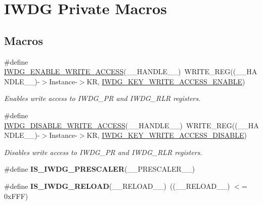 \hypertarget{group___i_w_d_g___private___macros}{}\section{I\+W\+DG Private Macros}
\label{group___i_w_d_g___private___macros}
\subsection*{Macros}
\begin{DoxyCompactItemize}
\item 
\#define \hyperlink{group___i_w_d_g___private___macros_ga65cf77f3cfd45d3fd66c0cf33d23d7ab}{I\+W\+D\+G\+\_\+\+E\+N\+A\+B\+L\+E\+\_\+\+W\+R\+I\+T\+E\+\_\+\+A\+C\+C\+E\+SS}(\+\_\+\+\_\+\+H\+A\+N\+D\+L\+E\+\_\+\+\_\+)~W\+R\+I\+T\+E\+\_\+\+R\+EG((\+\_\+\+\_\+\+H\+A\+N\+D\+L\+E\+\_\+\+\_\+)-\/$>$Instance-\/$>$KR, \hyperlink{group___i_w_d_g___registers___bit_mask_ga90fbb0a5e42ed25b44c0330ad75724e6}{I\+W\+D\+G\+\_\+\+K\+E\+Y\+\_\+\+W\+R\+I\+T\+E\+\_\+\+A\+C\+C\+E\+S\+S\+\_\+\+E\+N\+A\+B\+LE})
\begin{DoxyCompactList}\small\item\em Enables write access to I\+W\+D\+G\+\_\+\+PR and I\+W\+D\+G\+\_\+\+R\+LR registers. \end{DoxyCompactList}\item 
\#define \hyperlink{group___i_w_d_g___private___macros_ga31636a55162fc73caf03c2d2808ea9dd}{I\+W\+D\+G\+\_\+\+D\+I\+S\+A\+B\+L\+E\+\_\+\+W\+R\+I\+T\+E\+\_\+\+A\+C\+C\+E\+SS}(\+\_\+\+\_\+\+H\+A\+N\+D\+L\+E\+\_\+\+\_\+)~W\+R\+I\+T\+E\+\_\+\+R\+EG((\+\_\+\+\_\+\+H\+A\+N\+D\+L\+E\+\_\+\+\_\+)-\/$>$Instance-\/$>$KR, \hyperlink{group___i_w_d_g___registers___bit_mask_ga9e63bed9af448ad96c4621e74230a415}{I\+W\+D\+G\+\_\+\+K\+E\+Y\+\_\+\+W\+R\+I\+T\+E\+\_\+\+A\+C\+C\+E\+S\+S\+\_\+\+D\+I\+S\+A\+B\+LE})
\begin{DoxyCompactList}\small\item\em Disables write access to I\+W\+D\+G\+\_\+\+PR and I\+W\+D\+G\+\_\+\+R\+LR registers. \end{DoxyCompactList}\item 
\#define {\bfseries I\+S\+\_\+\+I\+W\+D\+G\+\_\+\+P\+R\+E\+S\+C\+A\+L\+ER}(\+\_\+\+\_\+\+P\+R\+E\+S\+C\+A\+L\+E\+R\+\_\+\+\_\+)
\item 
\#define {\bfseries I\+S\+\_\+\+I\+W\+D\+G\+\_\+\+R\+E\+L\+O\+AD}(\+\_\+\+\_\+\+R\+E\+L\+O\+A\+D\+\_\+\+\_\+)~((\+\_\+\+\_\+\+R\+E\+L\+O\+A\+D\+\_\+\+\_\+) $<$= 0x\+F\+F\+F)\hypertarget{group___i_w_d_g___private___macros_gad7ade0982243f56ba89ff764534f553c}{}\label{group___i_w_d_g___private___macros_gad7ade0982243f56ba89ff764534f553c}

\end{DoxyCompactItemize}



